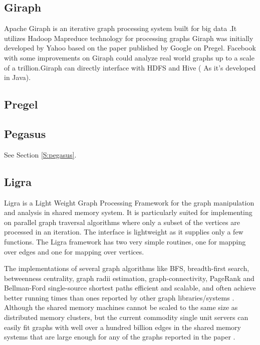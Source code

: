 \subsection{Giraph \cv}

     Apache Giraph is an iterative graph processing system built for big
     data \cite{www-giraph-apache}.It utilizes Hadoop Mapreduce
     technology for processing graphs \cite{www-apache-giraph-wiki}
     Giraph was initially developed by Yahoo based on the paper
     published by Google on Pregel. \cite{www-apache-giraph-pcworld}
     Facebook with some improvements on Giraph could analyze real world
     graphs up to a scale of a trillion.Giraph can directly interface
     with HDFS and Hive ( As it's developed in
     Java). \cite{www-apache-giraph-fb}
   
\subsection{Pregel}
\subsection{Pegasus}

     See Section \ref{S:pegasus}.

\subsection{Ligra}

     Ligra is a Light Weight Graph Processing Framework for the graph
     manipulation and analysis in shared memory system. It is
     particularly suited for implementing on parallel graph traversal
     algorithms where only a subset of the vertices are processed in an
     iteration. The interface is lightweight as it supplies only a
     few functions. The Ligra framework has two very simple routines,
     one for mapping over edges and one for mapping over vertices.

     The implementations of several graph algorithms like BFS,
     breadth-first search, betweenness centrality, graph radii
     estimation, graph-connectivity, PageRank and Bellman-Ford
     single-source shortest paths efficient and scalable, and often
     achieve better running times than ones reported by other graph
     libraries/systems \cite{ligra-paper-2013}.  Although the shared
     memory machines cannot be scaled to the same size as distributed
     memory clusters, but the current commodity single unit servers
     can easily fit graphs with well over a hundred billion edges in
     the shared memory systems that are large enough for any of the
     graphs reported in the paper \cite{ligra-paper-2}.

